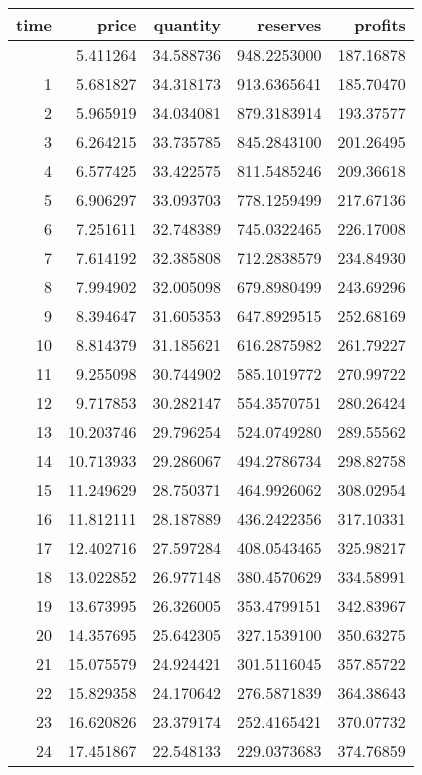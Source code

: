 \documentclass[
]{article}
\begin{document}
\begin{longtable}[]{@{}rrrrr@{}}
\toprule\noalign{}
time & price & quantity & reserves & profits \\
\midrule\noalign{}
\endhead
\bottomrule\noalign{}
\endlastfoot
0 & 5.411264 & 34.588736 & 948.2253000 & 187.16878 \\
1 & 5.681827 & 34.318173 & 913.6365641 & 185.70470 \\
2 & 5.965919 & 34.034081 & 879.3183914 & 193.37577 \\
3 & 6.264215 & 33.735785 & 845.2843100 & 201.26495 \\
4 & 6.577425 & 33.422575 & 811.5485246 & 209.36618 \\
5 & 6.906297 & 33.093703 & 778.1259499 & 217.67136 \\
6 & 7.251611 & 32.748389 & 745.0322465 & 226.17008 \\
7 & 7.614192 & 32.385808 & 712.2838579 & 234.84930 \\
8 & 7.994902 & 32.005098 & 679.8980499 & 243.69296 \\
9 & 8.394647 & 31.605353 & 647.8929515 & 252.68169 \\
10 & 8.814379 & 31.185621 & 616.2875982 & 261.79227 \\
11 & 9.255098 & 30.744902 & 585.1019772 & 270.99722 \\
12 & 9.717853 & 30.282147 & 554.3570751 & 280.26424 \\
13 & 10.203746 & 29.796254 & 524.0749280 & 289.55562 \\
14 & 10.713933 & 29.286067 & 494.2786734 & 298.82758 \\
15 & 11.249629 & 28.750371 & 464.9926062 & 308.02954 \\
16 & 11.812111 & 28.187889 & 436.2422356 & 317.10331 \\
17 & 12.402716 & 27.597284 & 408.0543465 & 325.98217 \\
18 & 13.022852 & 26.977148 & 380.4570629 & 334.58991 \\
19 & 13.673995 & 26.326005 & 353.4799151 & 342.83967 \\
20 & 14.357695 & 25.642305 & 327.1539100 & 350.63275 \\
21 & 15.075579 & 24.924421 & 301.5116045 & 357.85722 \\
22 & 15.829358 & 24.170642 & 276.5871839 & 364.38643 \\
23 & 16.620826 & 23.379174 & 252.4165421 & 370.07732 \\
24 & 17.451867 & 22.548133 & 229.0373683 & 374.76859 \\

\end{longtable}
\end{document}
